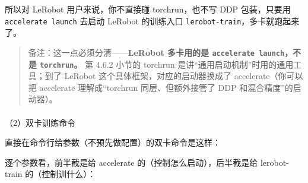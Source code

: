 \documentclass[
  chinese,
]{ctexart}
\makeatletter
\let\oldparagraph\paragraph
\renewcommand{\paragraph}{
    \@ifstar
      \xxxParagraphStar
      \xxxParagraphNoStar
  }
\newcommand{\xxxParagraphStar}[1]{\oldparagraph*{#1}\mbox{}}
\newcommand{\xxxParagraphNoStar}[1]{\oldparagraph{#1}\mbox{}}
\newenvironment{Shaded}{\begin{snugshade}}{\end{snugshade}}
\newcommand{\AttributeTok}[1]{\textcolor[rgb]{0.40,0.45,0.13}{#1}}
\newcommand{\DataTypeTok}[1]{\textcolor[rgb]{0.68,0.00,0.00}{#1}}
\newcommand{\ExtensionTok}[1]{\textcolor[rgb]{0.00,0.23,0.31}{#1}}
\newcommand{\FunctionTok}[1]{\textcolor[rgb]{0.28,0.35,0.67}{#1}}
\newcommand{\NormalTok}[1]{\textcolor[rgb]{0.00,0.23,0.31}{#1}}
\newcommand{\OperatorTok}[1]{\textcolor[rgb]{0.37,0.37,0.37}{#1}}
\newcommand{\VariableTok}[1]{\textcolor[rgb]{0.07,0.07,0.07}{#1}}
\makeatother
\begin{document}
所以对 LeRobot 用户来说，你不直接碰 torchrun，也不写 DDP 包装，只要用
\texttt{accelerate\ launch} 去启动 LeRobot 的训练入口
\texttt{lerobot-train}，多卡就跑起来了。

\begin{quote}
备注：这一点必须分清------\textbf{LeRobot 多卡用的是
\texttt{accelerate\ launch}，不是 \texttt{torchrun}。} 第 4.6.2 小节的
torchrun 是讲``通用启动机制''时用的通用工具；到了 LeRobot
这个具体框架，对应的启动器换成了 accelerate（你可以把 accelerate
理解成``torchrun 同层、但额外接管了 DDP 和混合精度''的启动器）。
\end{quote}

\paragraph{（2）双卡训练命令}\label{ux53ccux5361ux8badux7ec3ux547dux4ee4}

直接在命令行给参数（不预先做配置）的双卡命令是这样：

\begin{Shaded}
\end{Shaded}

逐个参数看，前半截是给 accelerate 的（控制怎么启动），后半截是给
lerobot-train 的（控制训什么）：
\end{document}
